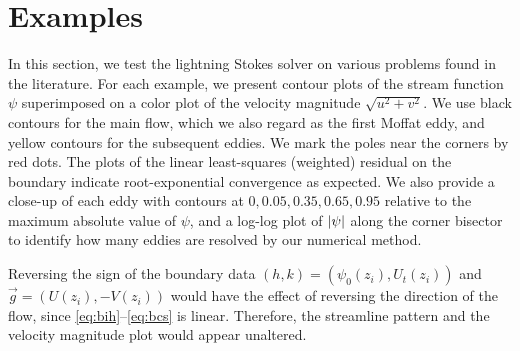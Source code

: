 
\section{Examples \label{sec:results}}
In this section, we test the lightning Stokes solver on various problems found in the literature. For each example, we present contour plots of the stream function $\psi$ superimposed on a color plot of the velocity magnitude $\sqrt{u^2+v^2}$. We use black contours for the main flow, which we also regard as the first Moffat eddy, and yellow contours for the subsequent eddies. We mark the poles near the corners by red dots. The plots of the linear least-squares (weighted) residual on the boundary indicate root-exponential convergence as expected. We also provide a close-up of each eddy with contours at $0,0.05,0.35,0.65,0.95$ relative to the maximum absolute value of $\psi$, and a log-log plot of $\abs{\psi}$ along the corner bisector to identify how many eddies are resolved by our numerical method.

Reversing the sign of the boundary data $(h,k)=(\psi_0(z_i), U_t(z_i))$ and $\vec{g}=(U(z_i), -V(z_i))$ would have the effect of reversing the direction of the flow, since \eqref{eq:bih}--\eqref{eq:bcs} is linear. Therefore, the streamline pattern and the velocity magnitude plot would appear unaltered.



